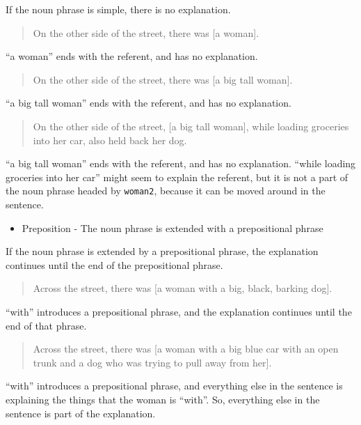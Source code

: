 \documentclass[
]{book}
\providecommand{\tightlist}{%
  \setlength{\itemsep}{0pt}\setlength{\parskip}{0pt}}
\begin{document}
If the noun phrase is simple, there is no explanation.

\begin{quote}
On the other side of the street,
there was {[}a woman{]}.
\end{quote}

``a woman'' ends with the referent, and has no explanation.

\begin{quote}
On the other side of the street,
there was {[}a big tall woman{]}.
\end{quote}

``a big tall woman'' ends with the referent, and has no explanation.

\begin{quote}
On the other side of the street,
{[}a big tall woman{]}, while loading groceries into her car,
also held back her dog.
\end{quote}

``a big tall woman'' ends with the referent, and has no explanation.
``while loading groceries into her car'' might seem to explain the referent,
but it is not a part of the noun phrase headed by \texttt{woman2},
because it can be moved around in the sentence.

\begin{itemize}
\tightlist
\item
  Preposition - The noun phrase is extended with a prepositional phrase
\end{itemize}

If the noun phrase is extended by a prepositional phrase,
the explanation continues until the end of the prepositional phrase.

\begin{quote}
Across the street,
there was {[}a woman with a big, black, barking dog{]}.
\end{quote}

``with'' introduces a prepositional phrase,
and the explanation continues until the end of that phrase.

\begin{quote}
Across the street,
there was {[}a woman with a big blue car with an open trunk
and a dog who was trying to pull away from her{]}.
\end{quote}

``with'' introduces a prepositional phrase,
and everything else in the sentence
is explaining the things that the woman is ``with''.
So, everything else in the sentence is part of the explanation.
\end{document}
